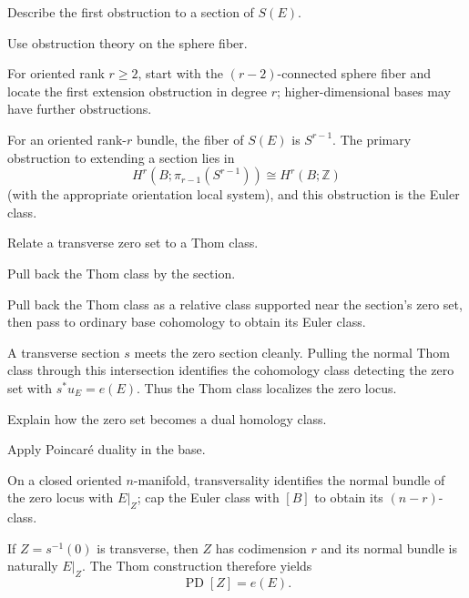 \begin{exercise}\label{exr:viii32-21}
Describe the first obstruction to a section of $S(E)$.
\end{exercise}
\begin{hint}
Use obstruction theory on the sphere fiber.

For oriented rank \(r\ge2\), start with the \((r-2)\)-connected sphere fiber and locate the first extension obstruction in degree \(r\); higher-dimensional bases may have further obstructions.
\end{hint}
\begin{solution}
For an oriented rank-\(r\) bundle, the fiber of \(S(E)\) is \(S^{r-1}\). The primary obstruction to extending a section lies in
\[
H^r(B;\pi_{r-1}(S^{r-1}))\cong H^r(B;\mathbb Z)
\]
(with the appropriate orientation local system), and this obstruction is the Euler class.
\end{solution}

\begin{exercise}\label{exr:viii32-22}
Relate a transverse zero set to a Thom class.
\end{exercise}
\begin{hint}
Pull back the Thom class by the section.

Pull back the Thom class as a relative class supported near the section's zero set, then pass to ordinary base cohomology to obtain its Euler class.
\end{hint}
\begin{solution}
A transverse section \(s\) meets the zero section cleanly. Pulling the normal Thom class through this intersection identifies the cohomology class detecting the zero set with \(s^*u_E=e(E)\). Thus the Thom class localizes the zero locus.
\end{solution}

\begin{exercise}\label{exr:viii32-23}
Explain how the zero set becomes a dual homology class.
\end{exercise}
\begin{hint}
Apply Poincaré duality in the base.

On a closed oriented \(n\)-manifold, transversality identifies the normal bundle of the zero locus with \(E|_Z\); cap the Euler class with \([B]\) to obtain its \((n-r)\)-class.
\end{hint}
\begin{solution}
If \(Z=s^{-1}(0)\) is transverse, then \(Z\) has codimension \(r\) and its normal bundle is naturally \(E|_Z\). The Thom construction therefore yields
\[
\operatorname{PD}[Z]=e(E).
\]
\end{solution}

